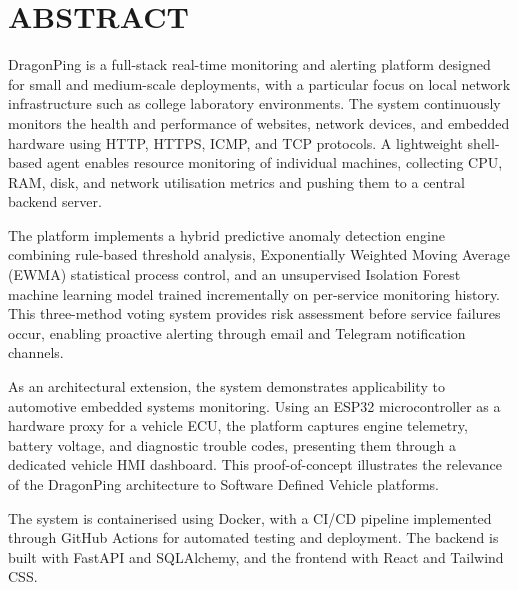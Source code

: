 \documentclass[12pt,a4paper,oneside]{report}
\renewcommand{\headrulewidth}{0.4pt}
\renewcommand{\footrulewidth}{0.4pt}
\renewcommand{\headrulewidth}{0.4pt}%
\renewcommand{\footrulewidth}{0.4pt}%
\renewcommand{\headrulewidth}{0pt}%
\renewcommand{\footrulewidth}{0pt}%
\begin{document}
\newpage
\listoffigures

\newpage
\listoftables

\newpage
{}
\chapter*{ABSTRACT}

DragonPing is a full-stack real-time monitoring and alerting
platform designed for small and medium-scale deployments, with a
particular focus on local network infrastructure such as college
laboratory environments. The system continuously monitors the health and
performance of websites, network devices, and embedded hardware using
HTTP, HTTPS, ICMP, and TCP protocols. A lightweight shell-based agent
enables resource monitoring of individual machines, collecting CPU, RAM,
disk, and network utilisation metrics and pushing them to a central
backend server.

\noindent The platform implements a hybrid predictive anomaly detection
engine combining rule-based threshold analysis, Exponentially Weighted
Moving Average (EWMA) statistical process control, and an unsupervised
Isolation Forest machine learning model trained incrementally on
per-service monitoring history. This three-method voting system provides
risk assessment before service failures occur, enabling proactive
alerting through email and Telegram notification channels.

\noindent As an architectural extension, the system demonstrates
applicability to automotive embedded systems monitoring. Using an ESP32
microcontroller as a hardware proxy for a vehicle ECU, the platform
captures engine telemetry, battery voltage, and diagnostic trouble codes,
presenting them through a dedicated vehicle HMI dashboard. This
proof-of-concept illustrates the relevance of the DragonPing architecture
to Software Defined Vehicle platforms.

\noindent The system is containerised using Docker, with a CI/CD pipeline
implemented through GitHub Actions for automated testing and deployment.
The backend is built with FastAPI and SQLAlchemy, and the frontend with
React and Tailwind CSS.

\newpage
\mbox{}
\newpage

\newpage
{}
\setcounter{page}{1}
\pagestyle{fancy}
\fancyhf{}
\fancyhead[C]{}
\fancyfoot[R]{\thepage}
\fancyfoot[C]{}
\renewcommand{\headrulewidth}{0.4pt}
\renewcommand{\footrulewidth}{0.4pt}
\fancypagestyle{plain}{%
  \fancyhf{}%
  \fancyhead[C]{}%
  \fancyfoot[L]{\small College of Engineering Trivandrum}%
  \fancyfoot[R]{\thepage}%
  \fancyfoot[C]{}%
  \renewcommand{\headrulewidth}{0.4pt}%
  \renewcommand{\footrulewidth}{0.4pt}%
}
\end{document}
